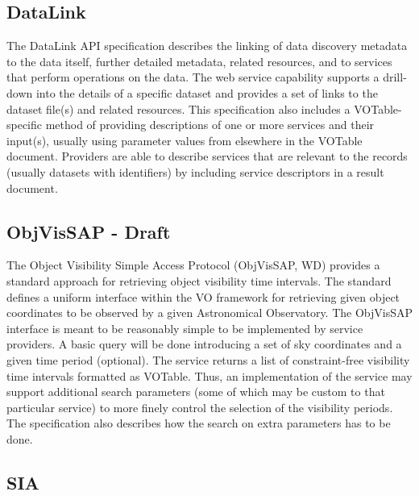\documentclass[11pt,a4paper]{ivoa}
\begin{document}
\subsection{DataLink}

The DataLink \citep{2015ivoa.spec.0617D} API specification describes the linking of data discovery metadata to  
the data itself, further detailed metadata, related resources, and to services that perform 
operations on the data. The web service capability supports a drill-down into the details 
of a specific dataset and provides a set of links to the dataset file(s) and related resources. 
This specification also includes a VOTable-specific method of providing descriptions of one 
or more services and their input(s), usually using parameter values from elsewhere in the 
VOTable document. Providers are able to describe services that are relevant to the records 
(usually datasets with identifiers) by including service descriptors in a result document. 

\subsection{ObjVisSAP - Draft}

The Object Visibility Simple Access Protocol (ObjVisSAP, WD)
provides a standard approach for retrieving object visibility time intervals. 
The standard defines a uniform interface within the VO framework for retrieving given object coordinates to be 
observed by a given Astronomical Observatory. The ObjVisSAP interface is meant to be 
reasonably simple to be implemented by service providers. A basic query will be done 
introducing a set of sky coordinates and a given time period (optional). The service 
returns a list of constraint-free visibility time intervals formatted as VOTable. Thus, 
an implementation of the service may support additional search parameters (some of which 
may be custom to that particular service) to more finely control the selection of the 
visibility periods. The specification also describes how the search on extra parameters 
has to be done.

\subsection{SIA}
\end{document}
